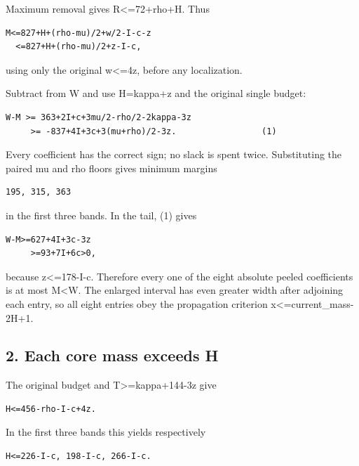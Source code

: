 \documentclass[10pt,a4paper]{article}
\theoremstyle{definition}
\begin{document}
Maximum removal gives R\textless=\allowbreak{}72+\allowbreak{}rho+\allowbreak{}H. Thus

\begin{lstlisting}
M<=827+H+(rho-mu)/2+w/2-I-c-z
  <=827+H+(rho-mu)/2+z-I-c,
\end{lstlisting}

using only the original w\textless=\allowbreak{}4z,\allowbreak{} before any localization.

Subtract from W and use H=\allowbreak{}kappa+\allowbreak{}z and the original single budget:

\begin{lstlisting}
W-M >= 363+2I+c+3mu/2-rho/2-2kappa-3z
     >= -837+4I+3c+3(mu+rho)/2-3z.                 (1)
\end{lstlisting}

Every coefficient has the correct sign; no slack is spent twice.
Substituting the paired mu and rho floors gives minimum margins

\begin{lstlisting}
195, 315, 363
\end{lstlisting}

in the first three bands. In the tail,\allowbreak{} (1) gives

\begin{lstlisting}
W-M>=627+4I+3c-3z
     >=93+7I+6c>0,
\end{lstlisting}

because z\textless=\allowbreak{}178-I-c. Therefore every one of the eight absolute
peeled coefficients is at most M\textless W. The enlarged interval has
even greater width after adjoining each entry,\allowbreak{} so all eight entries obey
the propagation criterion x\textless=\allowbreak{}current\_\allowbreak{}mass-2H+\allowbreak{}1.

\hypertarget{each-core-mass-exceeds-h}{%
\subsection{2. Each core mass exceeds
H}\label{each-core-mass-exceeds-h}}

The original budget and T\textgreater=\allowbreak{}kappa+\allowbreak{}144-3z give

\begin{lstlisting}
H<=456-rho-I-c+4z.
\end{lstlisting}

In the first three bands this yields respectively

\begin{lstlisting}
H<=226-I-c, 198-I-c, 266-I-c.
\end{lstlisting}
\end{document}
